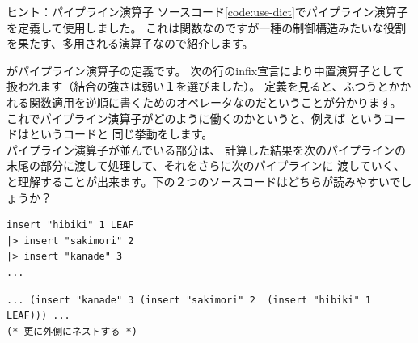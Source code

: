 \documentclass[11pt,a4paper]{jarticle}
\begin{document}
\begin{itembox}[l]{ヒント：パイプライン演算子}
ソースコード\ref{code:use-dict}でパイプライン演算子を定義して使用しました。
これは関数なのですが一種の制御構造みたいな役割を果たす、多用される演算子なので紹介します。

がパイプライン演算子\prog{|>}の定義です。
次の行のinfix宣言により中置演算子として扱われます（結合の強さは弱い１を選びました）。
定義を見ると、ふつうとかかれる関数適用を逆順に書くためのオペレータなのだということが分かります。
これでパイプライン演算子がどのように働くのかというと、例えば
というコードはというコードと
同じ挙動をします。\\
パイプライン演算子が並んでいる部分は、
計算した結果を次のパイプラインの末尾の部分に渡して処理して、それをさらに次のパイプラインに
渡していく、と理解することが出来ます。下の２つのソースコードはどちらが読みやすいでしょうか？

\begin{lstlisting}
insert "hibiki" 1 LEAF
|> insert "sakimori" 2
|> insert "kanade" 3
...
\end{lstlisting}

\begin{lstlisting}
... (insert "kanade" 3 (insert "sakimori" 2  (insert "hibiki" 1 LEAF))) ...
(* 更に外側にネストする *)
\end{lstlisting}

\end{itembox}
\end{document}
